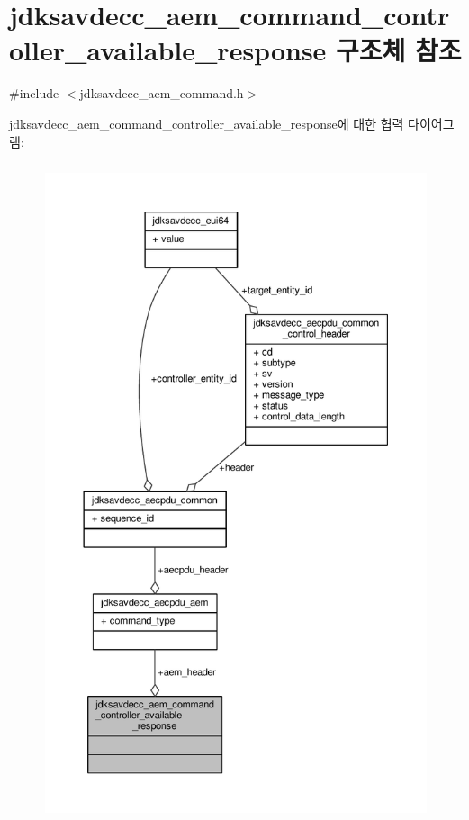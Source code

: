 \hypertarget{structjdksavdecc__aem__command__controller__available__response}{}\section{jdksavdecc\+\_\+aem\+\_\+command\+\_\+controller\+\_\+available\+\_\+response 구조체 참조}
\label{structjdksavdecc__aem__command__controller__available__response}


{\ttfamily \#include $<$jdksavdecc\+\_\+aem\+\_\+command.\+h$>$}



jdksavdecc\+\_\+aem\+\_\+command\+\_\+controller\+\_\+available\+\_\+response에 대한 협력 다이어그램\+:
\nopagebreak
\begin{figure}[H]
\begin{center}
\leavevmode
\includegraphics[height=550pt]{structjdksavdecc__aem__command__controller__available__response__coll__graph}
\end{center}
\end{figure}
